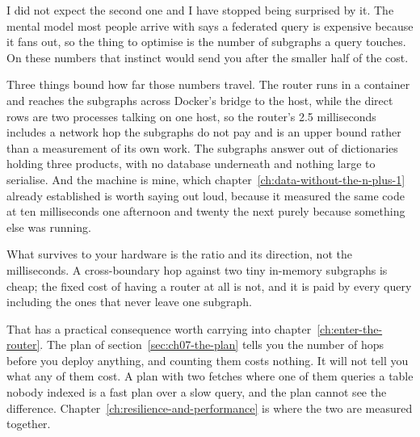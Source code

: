 \medskip
I did not expect the second one and I have stopped being surprised by it. The
mental model most people arrive with says a federated query is expensive because
it fans out, so the thing to optimise is the number of subgraphs a query
touches. On these numbers that instinct would send you after the smaller half of
the cost.

%
Three things bound how far those numbers travel. The router runs in a container
and reaches the subgraphs across Docker's bridge to the host, while the direct
rows are two processes talking on one host, so the router's 2.5 milliseconds
includes a network hop the subgraphs do not pay and is an upper bound rather
than a measurement of its own work. The subgraphs answer out of dictionaries
holding three products, with no database underneath and nothing large to
serialise. And the machine is mine, which
chapter~\ref{ch:data-without-the-n-plus-1} already established is worth saying
out loud, because it measured the same code at ten milliseconds one afternoon
and twenty the next purely because something else was running.

What survives to your hardware is the ratio and its direction, not the
milliseconds. A cross-boundary hop against two tiny in-memory subgraphs is
cheap; the fixed cost of having a router at all is not, and it is paid by every
query including the ones that never leave one subgraph.

%
That has a practical consequence worth carrying into
chapter~\ref{ch:enter-the-router}. The plan of
section~\ref{sec:ch07-the-plan} tells you the number of hops before you deploy
anything, and counting them costs nothing. It will not tell you what any of
them cost. A plan with two
fetches where one of them queries a table nobody indexed is a fast plan over a
slow query, and the plan cannot see the difference.
Chapter~\ref{ch:resilience-and-performance} is where the two are measured
together.

%
